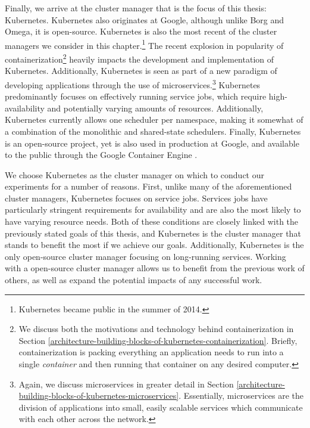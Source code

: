 Finally, we arrive at the cluster manager that is the focus of this thesis:
Kubernetes. Kubernetes also originates at Google, although unlike Borg and
Omega, it is open-source. Kubernetes is also the most
recent of the cluster managers we consider in this chapter.\footnote{Kubernetes
became public in the summer of 2014.} The recent
explosion in popularity of containerization\footnote{We discuss both the motivations and
technology behind containerization in Section
\ref{architecture-building-blocks-of-kubernetes-containerization}. Briefly, containerization is
packing everything an application needs to run into a single \textit{container}
and then running that container on any desired computer.}
heavily impacts the development and implementation of Kubernetes. Additionally,
Kubernetes is seen as part of a new paradigm of developing applications
through the use of microservices.\footnote{Again, we
discuss microservices in greater detail
in Section \ref{architecture-building-blocks-of-kubernetes-microservices}.
Essentially, microservices are the division of applications
into small, easily scalable services which communicate with each other across
the network.} Kubernetes predominantly focuses on effectively running service
jobs, which require high-availability and potentially varying amounts of resources.
Additionally, Kubernetes currently allows one scheduler per namespace, making it
somewhat of a combination of the monolithic and shared-state schedulers.
Finally, Kubernetes is an open-source project, yet is also used in production at
Google, and available to the public through the Google Container
Engine \cite{google-container-engine}.

We choose Kubernetes as the cluster manager on which to conduct our experiments
for a number of reasons. First, unlike many of the aforementioned cluster
managers, Kubernetes focuses on service jobs. Services jobs
have particularly stringent requirements for availability and are also the most
likely to have varying resource needs. Both of these conditions are closely linked
with the previously stated goals of this thesis, and Kubernetes is the cluster
manager that stands to benefit the most if we achieve our goals. Additionally,
Kubernetes is the only open-source cluster manager focusing on long-running
services. Working with a open-source cluster manager allows us to benefit from
the previous work of others, as well as expand the potential impacts of any
successful work.
